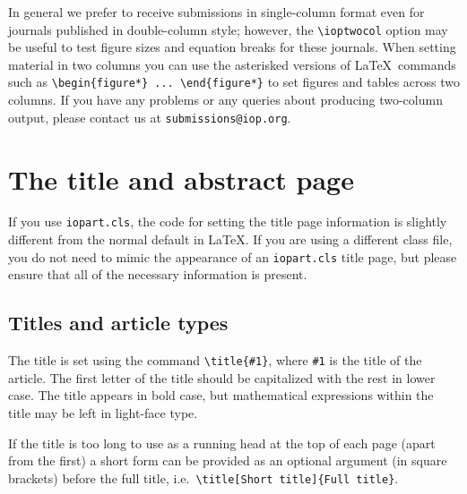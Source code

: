 \documentclass[12pt]{iopart}
\begin{document}
In general we prefer to receive submissions in single-column format even for journals
published in double-column style; however, the \verb"\ioptwocol" option may be useful to test figure sizes
and equation breaks for these journals.  When setting material
in two columns you can use the asterisked versions of \LaTeX\ commands such as \verb"\begin{figure*} ... \end{figure*}"
to set figures and tables across two columns.  If you have any problems or any queries about producing two-column output, please contact us at \verb"submissions@iop.org".

\section{The title and abstract page} 
If you use \verb"iopart.cls", the code for setting the title page information is slightly different from
the normal default in \LaTeX.  If you are using a different class file, you do not need to mimic the appearance of
an \verb"iopart.cls" title page, but please ensure that all of the necessary information is present.

\subsection{Titles and article types}
The title is set using the command
\verb"\title{#1}", where \verb"#1" is the title of the article. The
first letter 
of the title should be capitalized with the rest in lower case. 
The title appears in bold case, but mathematical expressions within the title may be left in light-face type. 

If the title is too long to use as a running head at the top of each page (apart from the
first) a short
form can be provided as an optional argument (in square brackets)
before the full title, i.e.\ \verb"\title[Short title]{Full title}".
\end{document}
